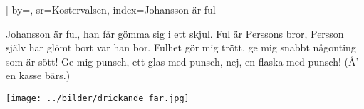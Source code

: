 

[ 		%
	by={},					%
	sr={Kostervalsen},					%
	index={Johansson är ful}]						%
	

\beginverse*						%
Johansson är ful,
han får gömma sig i ett skjul.
Ful är Perssons bror,
Persson själv har glömt bort var han bor.
Fulhet gör mig trött,
ge mig snabbt någonting som är sött!
Ge mig punsch,
ett glas med punsch,
nej, en flaska med punsch!
(Å' en kasse bärs.)
\endverse							%



\endsong							%

\begin{intersong}
 \begin{center}
\texttt{[image: ../bilder/drickande\_far.jpg]} 
\end{center}
\end{intersong}